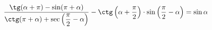 \begin{ex}[type=prove_identity]
	\begin{condition}
		\( \dfrac{\tg(\alpha+\pi)-\sin(\pi+\alpha)}{\ctg(\pi+\alpha)+\sec\left( \dfrac{\pi}{2}-\alpha \right)}-\ctg\left( \alpha+\dfrac{\pi}{2} \right)\cdot \sin\left( \dfrac{\pi}{2}-\alpha \right)=\sin\alpha \)
	\end{condition}
\end{ex}